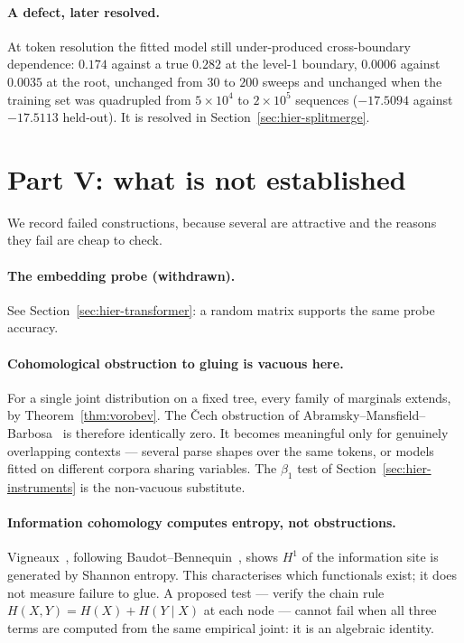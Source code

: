 \documentclass[11pt,a4paper]{article}
\theoremstyle{plain}
\theoremstyle{definition}
\begin{document}
\paragraph{A defect, later resolved.}
At token resolution the fitted model still under-produced cross-boundary
dependence: $0.174$ against a true $0.282$ at the level-1 boundary, $0.0006$
against $0.0035$ at the root, unchanged from $30$ to $200$ sweeps and unchanged
when the training set was quadrupled from $5\times10^4$ to $2\times10^5$
sequences ($-17.5094$ against $-17.5113$ held-out). It is resolved in
Section~\ref{sec:hier-splitmerge}.

\section{Part V: what is not established}
\label{sec:hier-negative}

We record failed constructions, because several are attractive and the reasons
they fail are cheap to check.

\paragraph{The embedding probe (withdrawn).}
See Section~\ref{sec:hier-transformer}: a random matrix supports the same
probe accuracy.

\paragraph{Cohomological obstruction to gluing is vacuous here.}
For a single joint distribution on a fixed tree, every family of marginals
extends, by Theorem~\ref{thm:vorobev}. The \v{C}ech obstruction of
Abramsky--Mansfield--Barbosa~\cite{amb2011} is therefore identically zero. It
becomes meaningful only for genuinely overlapping contexts --- several parse
shapes over the same tokens, or models fitted on different corpora sharing
variables. The $\beta_1$ test of Section~\ref{sec:hier-instruments} is the
non-vacuous substitute.

\paragraph{Information cohomology computes entropy, not obstructions.}
Vigneaux~\cite{vigneaux2019}, following Baudot--Bennequin~\cite{bb2015}, shows
$H^1$ of the information site is generated by Shannon entropy. This
characterises which functionals exist; it does not measure failure to glue. A
proposed test --- verify the chain rule $H(X,Y)=H(X)+H(Y\mid X)$ at each node
--- cannot fail when all three terms are computed from the same empirical
joint: it is an algebraic identity.
\end{document}
